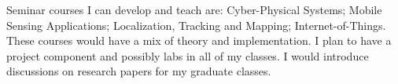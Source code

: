 \documentclass[10pt]{article}
\begin{document}
Seminar courses I can develop and teach are: Cyber-Physical Systems; Mobile Sensing Applications; Localization, Tracking and Mapping; Internet-of-Things. 
These courses would have a mix of theory and implementation. I plan to have a project component and possibly labs in all of my classes. I would introduce discussions on research papers for my graduate classes. 



\end{document}
